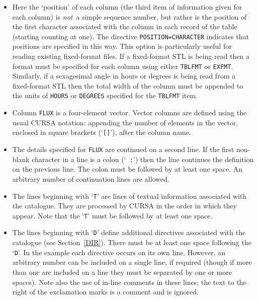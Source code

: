 \documentclass[twoside,11pt]{article}
\renewcommand{\_}{\texttt{\symbol{95}}}
\begin{document}
\begin{itemize}

  \item Here the `position' of each
   column (the third item of information given for each column) is
   {\it not}\, a simple sequence number, but rather is the position
   of the first character associated with the column in each record of the
   table (starting counting at one).
   The directive {\tt POSITION=CHARACTER} indicates that positions are
   specified in this way.  This option is particularly useful for
   reading existing fixed-format files.  If a fixed-format STL is
   being read then a format must be specified for each column using
   either {\tt TBLFMT} or {\tt EXFMT}.  Similarly, if a sexagesimal
   angle in hours or degrees is being read from a fixed-format STL
   then the total width of the column must be appended to the units
   of {\tt HOURS} or {\tt DEGREES} specified for the {\tt TBLFMT}
   item.

  \item Column {\tt FLUX} is a four-element vector.  Vector columns
   are defined using the usual CURSA notation: appending the number
   of elements in the vector, enclosed in square brackets (`{\tt []}'),
   after the column name.

  \item The details specified for {\tt FLUX} are continued on a second
   line.  If the first non-blank character in a line is a colon (`{\tt
   :}') then the line continues the definition on the previous line.
   The colon must be followed by at least one space.  An arbitrary
   number of continuation lines are allowed.

  \item The lines beginning with `{\tt T}' are lines of textual
   information associated with the catalogue.  They are processed by
   CURSA in the order in which they appear.  Note that the `{\tt T}'
   must be followed by at least one space.

  \item The lines beginning with `{\tt D}' define additional directives
   associated with the catalogue (see Section~\ref{DIR}).  There
   must be at least one space following the `{\tt D}'.  In the
   example each directive occurs on its own line.  However, an arbitrary
   number can be included on a single line, if required (though if more
   than one are included on a line they must be separated by one or
   more spaces).  Note also the use of in-line comments in these lines;
   the text to the right of the exclamation marks is a comment and is
   ignored.


\end{itemize}
\end{document}
